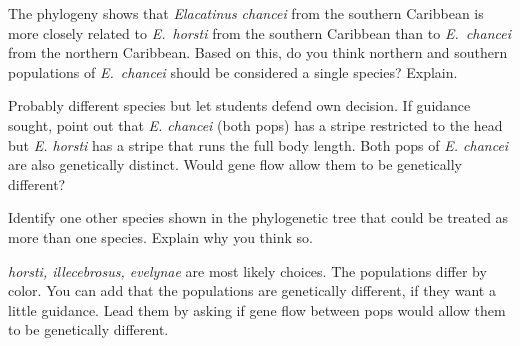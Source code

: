 \documentclass[12pt, hidelinks]{exam}
\newcommand*\AnswerBox[2]{%
    \parbox[t][#1]{0.92\textwidth}{%
    \begin{solution}#2\end{solution}}
    \vspace{\stretch{1}}
}
\begin{document}
\begin{questions}
\question[Checkout]
The phylogeny shows that \textit{Elacatinus chancei} from the southern Caribbean is more closely related to \textit{E.~horsti} from the southern Caribbean than to \textit{E.~chancei} from the northern Caribbean. Based on this, do you think northern and southern populations of \textit{E.~chancei} should be considered a single species?
Explain.

\AnswerBox{3\baselineskip}{Probably different species but let students defend own decision. 
If guidance sought, point out that \textit{E. chancei} (both pops) has a stripe restricted to the head
but \textit{E. horsti} has a stripe that runs the full body length. Both pops of \textit{E. chancei} are also
genetically distinct. Would gene flow allow them to be genetically different?}

\question[Checkout]
Identify one other species shown in the phylogenetic tree
that could be treated as more than one species. Explain why you think so.

\AnswerBox{3\baselineskip}{\textit{horsti, illecebrosus, evelynae} are most likely choices. 
The populations differ by color. You can add that the populations are genetically different, if 
they want a little guidance. Lead them by asking if gene flow between pops would allow them
to be genetically different.}


%
%

\end{questions}
\end{document}

